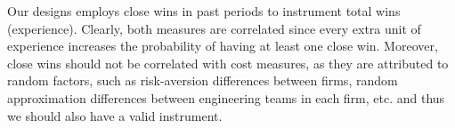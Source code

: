 Our designs employs close wins in past periods to instrument total wins (experience). Clearly, both measures are correlated since every extra unit of experience increases the probability of having at least one close win. Moreover, close wins should not be correlated with cost measures, as they are attributed to random factors, such as risk-aversion differences between firms, random approximation differences between engineering teams in each firm, etc. and thus we should also have a valid instrument.




